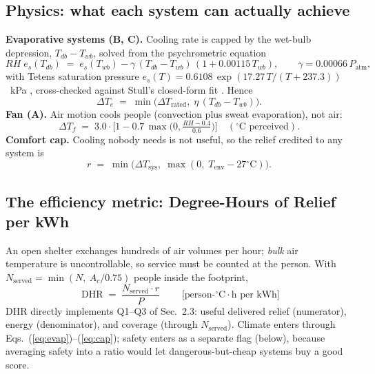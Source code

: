 \documentclass[11pt]{article}
\newcommand{\degrees}{\ensuremath{^\circ}}
\newcommand{\DHR}{\text{DHR}}
\begin{document}
\subsection{Physics: what each system can actually achieve}
\textbf{Evaporative systems (B, C).} Cooling rate is capped by the wet-bulb depression, $T_{db}-T_{wb}$, solved from the psychrometric equation \cite{ashrae}
\begin{equation}
RH\; e_s(T_{db}) \;=\; e_s(T_{wb}) - \gamma\,(T_{db}-T_{wb})\,(1+0.00115\,T_{wb}),\qquad \gamma = 0.00066\,P_{\text{atm}},
\end{equation}
with Tetens saturation pressure $e_s(T)=0.6108\,\exp(17.27\,T/(T+237.3))$~kPa \cite{ashrae}, cross-checked against Stull's closed-form fit \cite{stull}. Hence
\begin{equation}
\Delta T_e \;=\; \min\!\big(\Delta T_{\text{rated}},\; \eta\,(T_{db}-T_{wb})\big).
\label{eq:evap}
\end{equation}
\textbf{Fan (A).} Air motion cools people (convection plus sweat evaporation), not air:
\begin{equation}
\Delta T_f \;=\; 3.0\cdot\Big[1-0.7\,\max\!\big(0,\tfrac{RH-0.4}{0.6}\big)\Big]\quad(\degrees\text{C perceived}).
\label{eq:fan}
\end{equation}
\textbf{Comfort cap.} Cooling nobody needs is not useful, so the relief credited to any system is
\begin{equation}
r \;=\; \min\!\big(\Delta T_{\text{sys}},\; \max(0,\; T_{\text{env}}-27\degrees\text{C})\big).
\label{eq:cap}
\end{equation}

\subsection{The efficiency metric: Degree-Hours of Relief per kWh}
An open shelter exchanges hundreds of air volumes per hour; \emph{bulk} air temperature is uncontrollable, so service must be counted at the person. With $N_{\text{served}}=\min(N,\ A_c/0.75)$ people inside the footprint,
\begin{equation}
\boxed{\;\DHR \;=\; \frac{N_{\text{served}}\cdot r}{P}\;}
\qquad\text{[person-$\degrees$C$\cdot$h per kWh]}
\label{eq:dhr}
\end{equation}
$\DHR$ directly implements Q1--Q3 of Sec.~2.3: useful delivered relief (numerator), energy (denominator), and coverage (through $N_{\text{served}}$). Climate enters through Eqs.~(\ref{eq:evap})--(\ref{eq:cap}); safety enters as a separate flag (below), because averaging safety into a ratio would let dangerous-but-cheap systems buy a good score.
\end{document}
